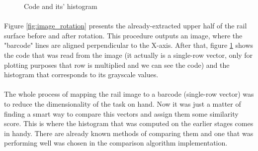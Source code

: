 \begin{figure}[H]
     \centering
     \vfill
     \caption{Code and its' histogram}
     \label{fig:code_with_histogram}
\end{figure}

\paragraph{}
Figure \ref{fig:image_rotation} presents the already-extracted upper half of the rail surface before and after rotation. This procedure outputs an image, where the "barcode" lines are aligned perpendicular to the X-axis. After that, figure \ref{fig:code_with_histogram} shows the code that was read from the image (it actually is a single-row vector, only for plotting purposes that row is multiplied and we can see the code) and the histogram that corresponds to its grayscale values.

\paragraph{}
The whole process of mapping the rail image to a barcode (single-row vector) was to reduce the dimensionality of the task on hand. Now it was just a matter of finding a smart way to compare this vectors and assign them some similarity score. This is where the histogram that was computed on the earlier stages comes in handy. There are already known methods of comparing them and one that was performing well was chosen in the comparison algorithm implementation.

